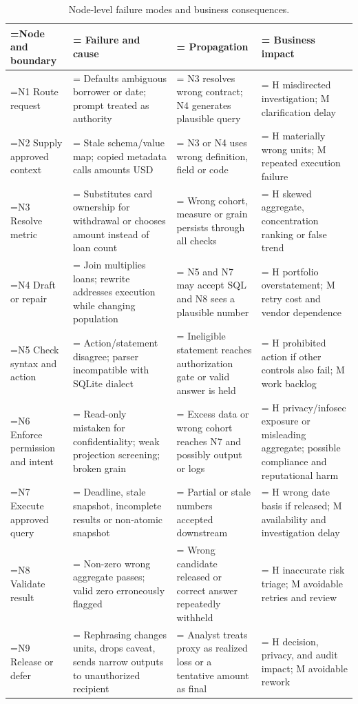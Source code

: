 \documentclass[11pt,a4paper,onecolumn,oneside]{rho-class/rho}
\begin{document}
{\setlength{\tabcolsep}{6pt}
\renewcommand{\arraystretch}{1.35}
\begin{table}[H]
\centering
\small
\begin{tabularx}{\linewidth}{@{}>{\hsize=1.000\hsize\linewidth=\hsize\RaggedRight\arraybackslash}X>{\hsize=1.000\hsize\linewidth=\hsize\RaggedRight\arraybackslash}X>{\hsize=1.000\hsize\linewidth=\hsize\RaggedRight\arraybackslash}X>{\hsize=1.000\hsize\linewidth=\hsize\RaggedRight\arraybackslash}X@{}}
\toprule
\textbf{Node and boundary} & \textbf{Failure and cause} & \textbf{Propagation} & \textbf{Business impact} \\ \midrule
N1 Route request & Defaults ambiguous borrower or date; prompt treated as authority & N3 resolves wrong contract; N4 generates plausible query & H misdirected investigation; M clarification delay \\
N2 Supply approved context & Stale schema/value map; copied metadata calls amounts USD & N3 or N4 uses wrong definition, field or code & H materially wrong units; M repeated execution failure \\
N3 Resolve metric & Substitutes card ownership for withdrawal or chooses amount instead of loan count & Wrong cohort, measure or grain persists through all checks & H skewed aggregate, concentration ranking or false trend \\
N4 Draft or repair & Join multiplies loans; rewrite addresses execution while changing population & N5 and N7 may accept SQL and N8 sees a plausible number & H portfolio overstatement; M retry cost and vendor dependence \\
N5 Check syntax and action & Action/statement disagree; parser incompatible with SQLite dialect & Ineligible statement reaches authorization gate or valid answer is held & H prohibited action if other controls also fail; M work backlog \\
N6 Enforce permission and intent & Read-only mistaken for confidentiality; weak projection screening; broken grain & Excess data or wrong cohort reaches N7 and possibly output or logs & H privacy/infosec exposure or misleading aggregate; possible compliance and reputational harm \\
N7 Execute approved query & Deadline, stale snapshot, incomplete results or non-atomic snapshot & Partial or stale numbers accepted downstream & H wrong date basis if released; M availability and investigation delay \\
N8 Validate result & Non-zero wrong aggregate passes; valid zero erroneously flagged & Wrong candidate released or correct answer repeatedly withheld & H inaccurate risk triage; M avoidable retries and review \\
N9 Release or defer & Rephrasing changes units, drops caveat, sends narrow outputs to unauthorized recipient & Analyst treats proxy as realized loss or a tentative amount as final & H decision, privacy, and audit impact; M avoidable rework \\
\bottomrule
\end{tabularx}
\caption{Node-level failure modes and business consequences.}
\end{table}
}
\end{document}
